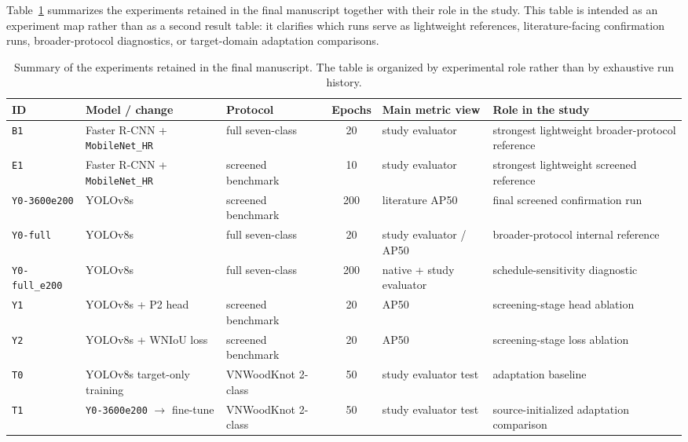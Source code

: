 Table~\ref{tab:experiment-summary} summarizes the experiments retained in the final manuscript together with their role in the study. This table is intended as an experiment map rather than as a second result table: it clarifies which runs serve as lightweight references, literature-facing confirmation runs, broader-protocol diagnostics, or target-domain adaptation comparisons.

\begin{table}[t]
  \centering
  \caption{Summary of the experiments retained in the final manuscript. The table is organized by experimental role rather than by exhaustive run history.}
  \label{tab:experiment-summary}
  \scriptsize
  \setlength{\tabcolsep}{4pt}
  \begin{tabularx}{\textwidth}{>{\raggedright\arraybackslash}p{} >{\raggedright\arraybackslash}p{} >{\raggedright\arraybackslash}p{} c >{\raggedright\arraybackslash}p{} X}
    \toprule
    ID & Model / change & Protocol & Epochs & Main metric view & Role in the study \\
    \midrule
    \texttt{B1} & Faster R-CNN + \texttt{MobileNet\_HR} & full seven-class & 20 & study evaluator & strongest lightweight broader-protocol reference \\
    \texttt{E1} & Faster R-CNN + \texttt{MobileNet\_HR} & screened benchmark & 10 & study evaluator & strongest lightweight screened reference \\
    \texttt{Y0-3600e200} & YOLOv8s & screened benchmark & 200 & literature AP50 & final screened confirmation run \\
    \texttt{Y0-full} & YOLOv8s & full seven-class & 20 & study evaluator / AP50 & broader-protocol internal reference \\
    \texttt{Y0-full\_e200} & YOLOv8s & full seven-class & 200 & native + study evaluator & schedule-sensitivity diagnostic \\
    \texttt{Y1} & YOLOv8s + P2 head & screened benchmark & 20 & AP50 & screening-stage head ablation \\
    \texttt{Y2} & YOLOv8s + WNIoU loss & screened benchmark & 20 & AP50 & screening-stage loss ablation \\
    \texttt{T0} & YOLOv8s target-only training & VNWoodKnot 2-class & 50 & study evaluator test & adaptation baseline \\
    \texttt{T1} & \texttt{Y0-3600e200} $\rightarrow$ fine-tune & VNWoodKnot 2-class & 50 & study evaluator test & source-initialized adaptation comparison \\
    \bottomrule
  \end{tabularx}
\end{table}

